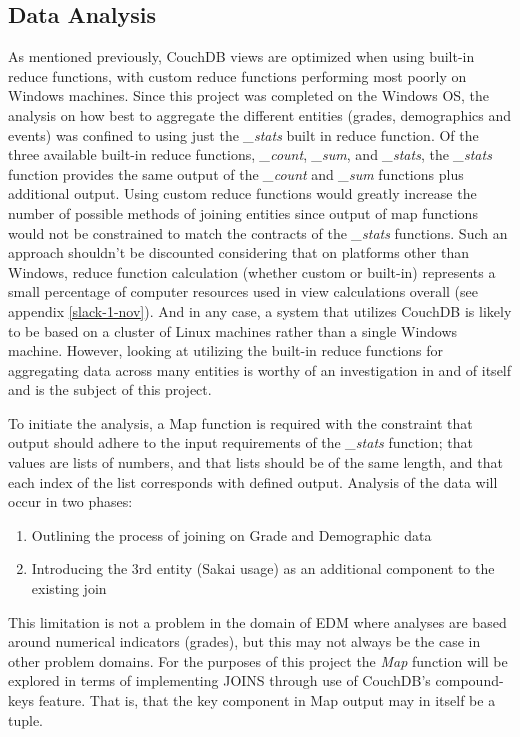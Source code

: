 \subsection{Data Analysis}
As mentioned previously, CouchDB views are optimized when using built-in reduce functions, with custom reduce functions performing most poorly on Windows machines. Since this project was completed on the Windows OS, the analysis on how best to aggregate the different entities (grades, demographics and events) was confined to using just the \textit{\_stats} built in reduce function. Of the three available built-in reduce functions, \textit{\_count}, \textit{\_sum}, and \textit{\_stats}, the \textit{\_stats} function provides the same output of the \textit{\_count} and \textit{\_sum} functions plus additional output. Using custom reduce functions would greatly increase the number of possible methods of joining entities since output of map functions would not be constrained to match the contracts of the \textit{\_stats} functions. Such an approach shouldn't be discounted considering that on platforms other than Windows, reduce function calculation (whether custom or built-in) represents a small percentage of computer resources used in view calculations overall (see appendix \ref{slack-1-nov}). And in any case, a system that utilizes CouchDB is likely to be based on a cluster of Linux machines rather than a single Windows machine. However, looking at utilizing the built-in reduce functions for aggregating data across many entities is worthy of an investigation in and of itself and is the subject of this project.

To initiate the analysis, a Map function is required with the constraint that output should adhere to the input requirements of the \textit{\_stats} function; that values are lists of numbers, and that lists should be of the same length, and that each index of the list corresponds with defined output. Analysis of the data will occur in two phases:

\begin{enumerate}
    \item Outlining the process of joining on Grade and Demographic data
    \item Introducing the 3rd entity (Sakai usage) as an additional component to the existing join
\end{enumerate}

This limitation is not a problem in the domain of EDM where analyses are based around numerical indicators (grades), but this may not always be the case in other problem domains. For the purposes of this project the \textit{Map} function will be explored in terms of implementing JOINS through use of CouchDB's compound-keys feature. That is, that the key component in Map output may in itself be a tuple.

